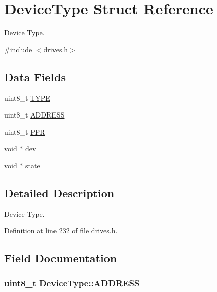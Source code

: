 \hypertarget{structDeviceType}{}\section{Device\+Type Struct Reference}
\label{structDeviceType}


Device Type.  




{\ttfamily \#include $<$drives.\+h$>$}

\subsection*{Data Fields}
\begin{DoxyCompactItemize}
\item 
uint8\+\_\+t \hyperlink{structDeviceType_acee5219162b6f47a9423b2086d127ede}{T\+Y\+PE}
\item 
uint8\+\_\+t \hyperlink{structDeviceType_a62529b7435785e39e8e7c5019303c2dd}{A\+D\+D\+R\+E\+SS}
\item 
uint8\+\_\+t \hyperlink{structDeviceType_ae0e59c6c17582ff80bdab3f2010e8d57}{P\+PR}
\item 
void $\ast$ \hyperlink{structDeviceType_a59fc3b3cb45f8ee0cd1016bd64804d3b}{dev}
\item 
void $\ast$ \hyperlink{structDeviceType_ad0fc43d63606bab6c259047e36512e08}{state}
\end{DoxyCompactItemize}


\subsection{Detailed Description}
Device Type. 

Definition at line 232 of file drives.\+h.



\subsection{Field Documentation}
\subsubsection[{\texorpdfstring{A\+D\+D\+R\+E\+SS}{ADDRESS}}]{\setlength{\rightskip}{0pt plus 5cm}uint8\+\_\+t Device\+Type\+::\+A\+D\+D\+R\+E\+SS}\hypertarget{structDeviceType_a62529b7435785e39e8e7c5019303c2dd}{}\label{structDeviceType_a62529b7435785e39e8e7c5019303c2dd}



